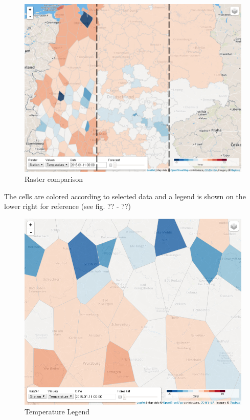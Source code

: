 \documentclass[paper=a4, fontsize=11pt]{scrartcl} %
\numberwithin{equation}{section} %
\numberwithin{figure}{section} %
\numberwithin{table}{section} %
\begin{document}
\begin{figure}[htbp]
\centering
\includegraphics[width=1\textwidth]{pictures/screenshot-raster.png}
\caption{Raster comparison}
\end{figure}

The cells are colored according to selected data and a legend is shown
on the lower right for reference (see fig. ?? - ??)

\begin{figure}[htbp]
\centering
\includegraphics[width=1\textwidth]{pictures/screenshot-legend-temp.png}
\caption{Temperature Legend}
\end{figure}
\end{document}
